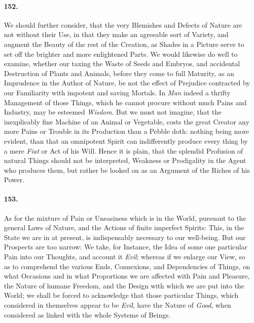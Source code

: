 \documentclass[]{article}
\newenvironment{sectionbody}{\begin{multicols}{2}}{\end{multicols}}
\begin{document}
\begin{sectionbody}
\paragraph{152.} We should further consider, that the very Blemishes and Defects
of Nature are not without their Use, in that they make an
agreeable sort of Variety, and augment the Beauty of the rest of
the Creation, as Shades in a Picture serve to set off the
brighter and more enlightened Parts.  We would likewise do well
to examine, whether our taxing the Waste of Seeds and Embryos,
and accidental Destruction of Plants and Animals, before they
come to full Maturity, as an Imprudence in the Author of Nature,
be not the effect of Prejudice contracted by our Familiarity with
impotent and saving Mortals.  In \emph{Man} indeed a thrifty
Management of those Things, which he cannot procure without much
Pains and Industry, may be esteemed \emph{Wisdom}.  But we must
not imagine, that the inexplicably fine Machine of an Animal or
Vegetable, costs the great {\sc Creator} any more Pains or
Trouble in its Production than a Pebble doth: nothing being more
evident, than that an omnipotent Spirit can indifferently produce
every thing by a mere \emph{Fiat} or Act of his Will.  Hence it
is plain, that the splendid Profusion of natural Things should
not be interpreted, Weakness or Prodigality in the Agent who
produces them, but rather be looked on as an Argument of the
Riches of his Power.



\paragraph{153.} As for the mixture of Pain or Uneasiness which is in the World,
pursuant to the general Laws of Nature, and the Actions of finite
imperfect Spirits: This, in the State we are in at present, is
indispensably necessary to our well-being.  But our Prospects are
too narrow: We take, for Instance, the Idea of some one
particular Pain into our Thoughts, and account it \emph{Evil};
whereas if we enlarge our View, so as to comprehend the various
Ends, Connexions, and Dependencies of Things, on what Occasions
and in what Proportions we are affected with Pain and Pleasure,
the Nature of humane Freedom, and the Design with which we are
put into the World; we shall be forced to acknowledge that those
particular Things, which considered in themselves appear to be
\emph{Evil}, have the Nature of \emph{Good}, when considered
as linked with the whole Systeme of Beings.




\end{sectionbody}
\end{document}
